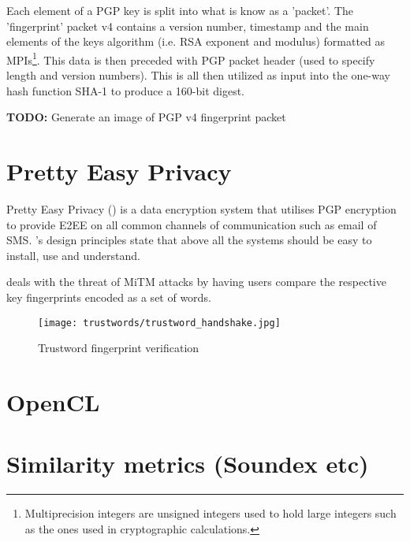 Each element of a PGP key is split into what is know as a 'packet'. The 'fingerprint' packet v4 contains a version number, timestamp and the main elements of the keys algorithm (i.e. RSA exponent and modulus) formatted as MPIs\footnote{Multiprecision integers are unsigned integers used to hold large integers such as the ones used in cryptographic calculations.}. This data is then preceded with PGP packet header (used to specify length and version numbers). This is all then utilized as input into the one-way hash function SHA-1 to produce a 160-bit digest.

\textbf{TODO: } Generate an image of PGP v4 fingerprint packet

\section{Pretty Easy Privacy}
Pretty Easy Privacy (\pep) is a data encryption system that utilises PGP encryption to provide E2EE on all common channels of communication such as email of SMS. \pep's design principles state that above all the systems should be easy to install, use and understand.

\pep deals with the threat of MiTM attacks by having users compare the respective key fingerprints encoded as a set of words. 

\begin{figure}[h!]
    \centering
    \texttt{[image: trustwords/trustword\_handshake.jpg]}
    \caption{Trustword fingerprint verification}
\end{figure}

\section{OpenCL}

\section{Similarity metrics (Soundex etc)}